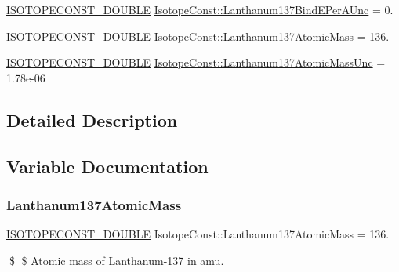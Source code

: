 \begin{DoxyCompactItemize}
\mbox{\hyperlink{group___isotope_const-_macros_ga8f45a7272ce02c0b4c65c44636ed719a}{I\+S\+O\+T\+O\+P\+E\+C\+O\+N\+S\+T\+\_\+\+D\+O\+U\+B\+LE}} \mbox{\hyperlink{group___isotope_const-_lanthanum-_la137_ga584801963816c96b81ded27c648e1a1a}{Isotope\+Const\+::\+Lanthanum137\+Bind\+E\+Per\+A\+Unc}} = 0.
\item 
\mbox{\hyperlink{group___isotope_const-_macros_ga8f45a7272ce02c0b4c65c44636ed719a}{I\+S\+O\+T\+O\+P\+E\+C\+O\+N\+S\+T\+\_\+\+D\+O\+U\+B\+LE}} \mbox{\hyperlink{group___isotope_const-_lanthanum-_la137_ga3b70bae93fa93d04953cd1284751b637}{Isotope\+Const\+::\+Lanthanum137\+Atomic\+Mass}} = 136.
\item 
\mbox{\hyperlink{group___isotope_const-_macros_ga8f45a7272ce02c0b4c65c44636ed719a}{I\+S\+O\+T\+O\+P\+E\+C\+O\+N\+S\+T\+\_\+\+D\+O\+U\+B\+LE}} \mbox{\hyperlink{group___isotope_const-_lanthanum-_la137_gadf523d2879da3d41714c0d0513793937}{Isotope\+Const\+::\+Lanthanum137\+Atomic\+Mass\+Unc}} = 1.\+78e-\/06
\end{DoxyCompactItemize}


\subsection{Detailed Description}


\subsection{Variable Documentation}
\mbox{\label{group___isotope_const-_lanthanum-_la137_ga3b70bae93fa93d04953cd1284751b637}} 
\subsubsection{\texorpdfstring{Lanthanum137\+Atomic\+Mass}{Lanthanum137AtomicMass}}
{\footnotesize\ttfamily \mbox{\hyperlink{group___isotope_const-_macros_ga8f45a7272ce02c0b4c65c44636ed719a}{I\+S\+O\+T\+O\+P\+E\+C\+O\+N\+S\+T\+\_\+\+D\+O\+U\+B\+LE}} Isotope\+Const\+::\+Lanthanum137\+Atomic\+Mass = 136.}

\$ \$ Atomic mass of Lanthanum-\/137 in amu. \mbox{\label{group___isotope_const-_lanthanum-_la137_gadf523d2879da3d41714c0d0513793937}} 
